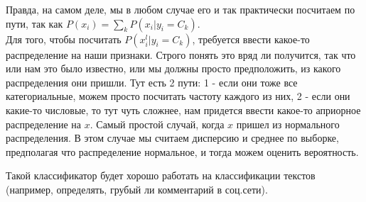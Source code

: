 Правда, на самом деле, мы в любом случае его и так практически посчитаем по пути, так как $P(x_i) = \sum_kP(x_i|y_i=C_k)$.\\

Для того, чтобы посчитать $P(x_i^l|y_i = C_k)$, требуется ввести какое-то распределение на наши признаки. Строго понять это вряд ли получится, так что или нам это было известно, или мы должны просто предположить, из какого распределения они пришли. Тут есть 2 пути: 1 - если они тоже все категориальные, можем просто посчитать частоту каждого из них, 2 - если они какие-то числовые, то тут чуть сложнее, нам придется ввести какое-то априорное распределение на $x$. Самый простой случай, когда $x$ пришел из нормального распределения. В этом случае мы считаем дисперсию и среднее по выборке, предполагая что распределение нормальное, и тогда можем оценить вероятность.

Такой классификатор будет хорошо работать на классификации текстов (например, определять, грубый ли комментарий в соц.сети).